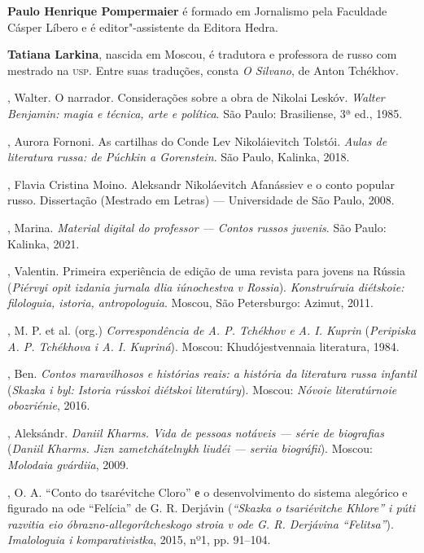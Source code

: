 {\noindent\textbf{Paulo Henrique Pompermaier} é formado em Jornalismo pela Faculdade Cásper Líbero e é editor"-assistente da Editora Hedra.

\noindent\textbf{Tatiana Larkina}, nascida em Moscou, é tradutora e professora de russo com mestrado na \textsc{usp}. Entre suas traduções, consta \textit{O Silvano}, de Anton Tchékhov.

\begin{bibliohedra}

, Walter. O narrador. Considerações sobre a obra de Nikolai Leskóv. \textit{Walter Benjamin: magia e técnica, arte e política}. São Paulo: Brasiliense, 3ª ed., 1985.

, Aurora Fornoni. As cartilhas do Conde Lev Nikoláievitch Tolstói. \textit{Aulas de literatura russa: de Púchkin a Gorenstein}. São Paulo, Kalinka, 2018.

, Flavia Cristina Moino. Aleksandr Nikoláevitch Afanássiev e o conto popular russo. Dissertação (Mestrado em Letras) — Universidade de São Paulo, 2008.

, Marina. \textit{Material digital do professor — Contos russos juvenis}. São Paulo: Kalinka, 2021.

, Valentin. Primeira experiência de edição de uma revista para jovens na Rússia (\textit{Piérvyi opit izdania jurnala dlia iúnochestva v Rossia}). \textit{Konstruíruia diétskoie: filologuia, istoria, antropologuia}. Moscou, São Petersburgo: Azimut, 2011.

, M. P. et al. (org.) \textit{Correspondência de A. P. Tchékhov e A. I. Kuprin} (\textit{Peripiska A. P. Tchékhova i A. I. Kupriná}). Moscou: Khudójestvennaia literatura, 1984.

, Ben. \textit{Contos maravilhosos e histórias reais: a história da literatura russa infantil} (\textit{Skazka i byl: Istoria rússkoi diétskoi literatúry}). Moscou: \textit{Nóvoie literatúrnoie obozriénie}, 2016.

, Aleksándr. \textit{Daniil Kharms. Vida de pessoas notáveis — série de biografias} (\textit{Daniil Kharms. Jizn zametchátelnykh liudéi — seriia biográfii}). Moscou: \textit{Molodaia gvárdiia}, 2009.

, O. A. “Conto do tsarévitche Cloro” е o desenvolvimento do sistema alegórico e figurado na ode “Felícia” de G. R. Derjávin (\textit{“Skazka o tsariévitche Khlore” i púti razvitia eio óbrazno-allegorítcheskogo stroia v ode G. R. Derjávina “Felitsa”}). \textit{Imalologuia i komparativistka}, 2015, nº1, pp. 91–104.


\end{bibliohedra}}

